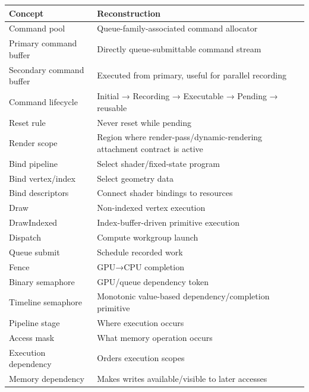 {\def\LTcaptype{none} %
\begin{longtable}[]{@{}
  >{\raggedright\arraybackslash}p{}
  >{\raggedright\arraybackslash}p{}@{}}
\toprule\noalign{}
\begin{minipage}[b]{\linewidth}\raggedright
Concept
\end{minipage} & \begin{minipage}[b]{\linewidth}\raggedright
Reconstruction
\end{minipage} \\
\midrule\noalign{}
\endhead
\bottomrule\noalign{}
\endlastfoot
Command pool & Queue-family-associated command allocator \\
Primary command buffer & Directly queue-submittable command stream \\
Secondary command buffer & Executed from primary, useful for parallel recording \\
Command lifecycle & Initial → Recording → Executable → Pending → reusable \\
Reset rule & Never reset while pending \\
Render scope & Region where render-pass/dynamic-rendering attachment contract is active \\
Bind pipeline & Select shader/fixed-state program \\
Bind vertex/index & Select geometry data \\
Bind descriptors & Connect shader bindings to resources \\
Draw & Non-indexed vertex execution \\
DrawIndexed & Index-buffer-driven primitive execution \\
Dispatch & Compute workgroup launch \\
Queue submit & Schedule recorded work \\
Fence & GPU→CPU completion \\
Binary semaphore & GPU/queue dependency token \\
Timeline semaphore & Monotonic value-based dependency/completion primitive \\
Pipeline stage & Where execution occurs \\
Access mask & What memory operation occurs \\
Execution dependency & Orders execution scopes \\
Memory dependency & Makes writes available/visible to later accesses \\

\end{longtable}}
